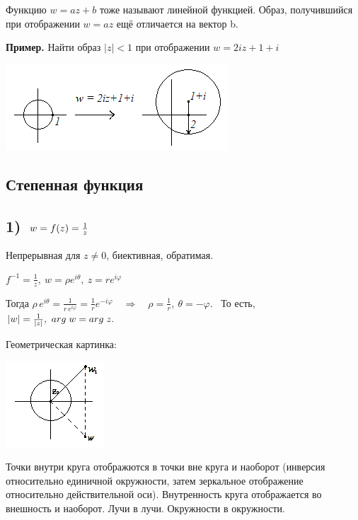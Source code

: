\documentclass[a4paper, 12pt]{report}
\begin{document}
Функцию $w = az + b$ тоже называют линейной функцией. Образ, получившийся при отображении $w = az $ ещё отличается на вектор b.

\par\bigskip\textbf{Пример.} \quad Найти образ $\left\lvert z\right\rvert < 1$ при отображении $w = 2iz + 1 + i$

\includegraphics{5-6/2io.png}

\subsection{Степенная функция}
\subsection*{1)$\hspace{3 mm} w = f(z) = \frac{1}{z} $} 

\par{Непрерывная для $z\neq 0$, биективная, обратимая.} 

$f^{-1} = \frac{1}{z},\ w = \rho e^{i\theta },\ z = re^{i\varphi }$

Тогда $\rho\, e^{i\theta } = \frac{1}{r\,e^{i\varphi }} = \frac{1}{r} e^{-i\varphi }\quad \Rightarrow \quad \rho = \frac{1}{r},\ \theta = -\varphi   $.
 \ То есть, $\left\lvert w\right\rvert = \frac{1}{\left\lvert z\right\rvert },\  arg\hspace{1 mm}w = arg\hspace{1 mm}z.  $

Геометрическая картинка:

\includegraphics{5-6/3io.png}
\par
Точки внутри круга отображются в точки вне круга и наоборот (инверсия относительно единичной окружности, затем зеркальное отображение относительно действительной оси).
Внутренность круга отображается во внешность и наоборот. Лучи в лучи. Окружности в окружности.
\end{document}
